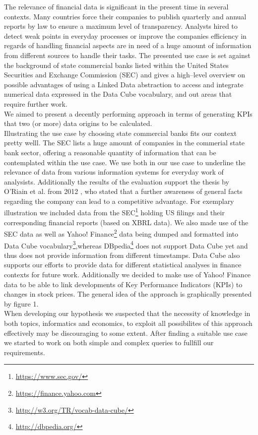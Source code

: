 \documentclass[runningheads]{llncs}
\begin{document}
The relevance of financial data is significant in the present time in several contexts. Many countries force their companies to publish quarterly and annual reports by law to ensure a maximum level of transparency. Analysts hired to detect weak points in everyday processes or improve the companies efficiency in regards of handling financial aspects are in need of a huge amount of information from different sources to handle their tasks. The presented use case is set against the background of state commercial banks listed within the United States Securities and Exchange Commission (SEC) and gives a high--level overview on possible advantages of using a Linked Data abstraction to access and integrate numerical data expressed in the Data Cube vocabulary, and out areas that require further work.\\
We aimed to present a decently performing approach in terms of generating KPIs that two (or more) data origins to be calculated.\\
Illustrating the use case by choosing state commercial banks fits our context pretty welll. The SEC lists a huge amount of companies in the commerial state bank sector, offering a reasonable quantity of information that can be contemplated within the use case. We use both in our use case to underline the relevance of data from various information systems for everyday work of analysists. Additionally the results of the evaluation support the thesis by O'Riain et al. from 2012 \cite{OCH12}, who stated that a further awareness of general facts regarding the company can lead to a competitive advantage. For exemplary illustration we included data from the SEC\footnote{\url{https://www.sec.gov/}} holding US filings and their corresponding financial reports (based on XBRL data). We also made use of the SEC data as well as Yahoo! Finance\footnote{\url{https://finance.yahoo.com}} data being dumped and formatted into Data Cube vocabulary\footnote{\url{http://w3.org/TR/vocab-data-cube/}},whereas DBpedia\footnote{\url{http://dbpedia.org/}} does not support Data Cube yet and thus does not provide information from different timestamps. Data Cube also supports our efforts to provide data for different statistical analyses in finance contexts for future work. Additionally we decided to make use of Yahoo! Finance data to be able to link developments of Key Performance Indicators (KPIs) to changes in stock prices. The general idea of the approach is graphically presented by figure 1. \\
When developing our hypothesis we suspected that the necessity of knowledge in both topics, informatics and economics, to exploit all possibilites of this approach effectively may be discouraging to some extent. After finding a suitable use case we started to work on both simple and complex queries to fullfill our requirements.\\
\end{document}
